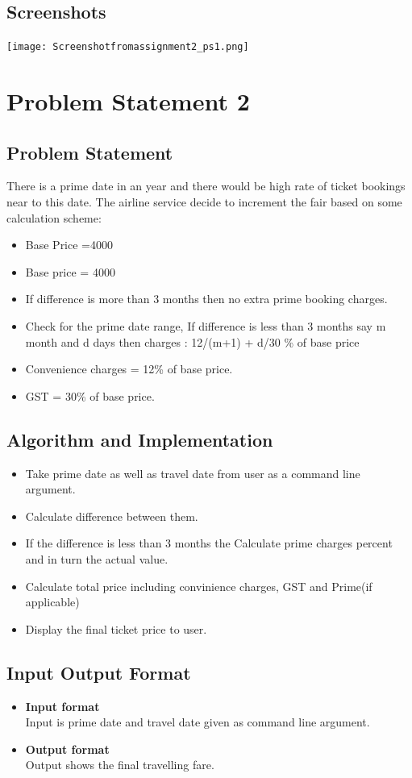 \documentclass[a4paper,12pt]{article}
\begin{document}
\subsection{Screenshots}

\texttt{[image: Screenshotfromassignment2\_ps1.png]}

\section{Problem Statement 2}
\subsection{Problem Statement}
There is a prime date in an year and there would be high rate of ticket bookings near to this date. The airline service decide to increment the fair based on some calculation scheme:
\begin{itemize}
\item Base Price =4000
\item Base price = 4000
\item If difference is more than 3 months then no extra prime booking charges.
\item Check for the prime date range, If difference is less than 3 months  say m month and d days then charges : { 12/(m+1) + d/30 }\% of base price
\item Convenience charges = 12\% of base price.
\item GST = 30\% of base price. 
\end{itemize}

\subsection{Algorithm and Implementation}
\begin{itemize}
\item Take prime date as well as travel date from user as a command line argument.
\item Calculate difference between them.
\item If the difference is less than 3 months the Calculate prime charges percent and in turn the actual value.
\item Calculate total price including convinience charges, GST and Prime(if applicable)
\item Display the final ticket price to user.
\end{itemize}
\subsection{Input Output Format}
\begin{itemize}
\item \textbf{Input format} \\
Input is prime date and travel date given as command line argument.\\
\item \textbf{Output format}\\
Output shows the final travelling fare. \\
\end{itemize}
\end{document}
